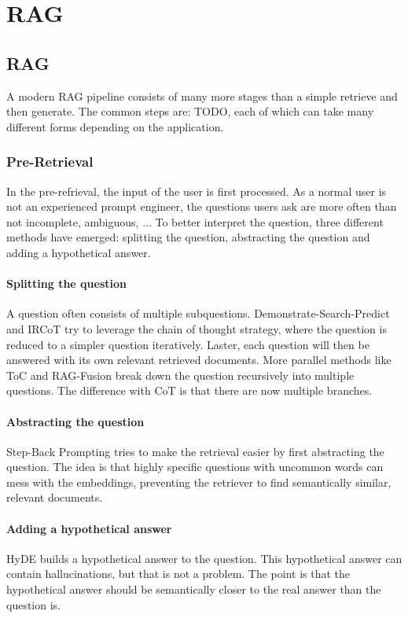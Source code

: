 
\chapter{RAG}


\section{RAG}
A modern RAG pipeline consists of many more stages than a simple retrieve and then generate. The common steps are: TODO, each of which can take many different forms depending on the application.

\subsection{Pre-Retrieval}
In the pre-refrieval, the input of the user is first processed. As a normal user is not an experienced prompt engineer, the questions users ask are more often than not incomplete, ambiguous, ... To better interpret the question, three different methods have emerged: splitting the question, abstracting the question and adding a hypothetical answer.
\subsubsection{Splitting the question}
A question often consists of multiple subquestions. Demonstrate-Search-Predict and IRCoT try to leverage the chain of thought strategy, where the question is reduced to a simpler question iteratively. Laster, each question will then be answered with its own relevant retrieved documents. More parallel methods like ToC and RAG-Fusion break down the question recursively into multiple questions. The difference with CoT is that there are now multiple branches.
\subsubsection{Abstracting the question}
Step-Back Prompting tries to make the retrieval easier by first abstracting the question. The idea is that highly specific questions with uncommon words can mess with the embeddings, preventing the retriever to find semantically similar, relevant documents.
\subsubsection{Adding a hypothetical answer}
HyDE builds a hypothetical answer to the question. This hypothetical answer can contain hallucinations, but that is not a problem. The point is that the hypothetical answer should be semantically closer to the real answer than the question is.

